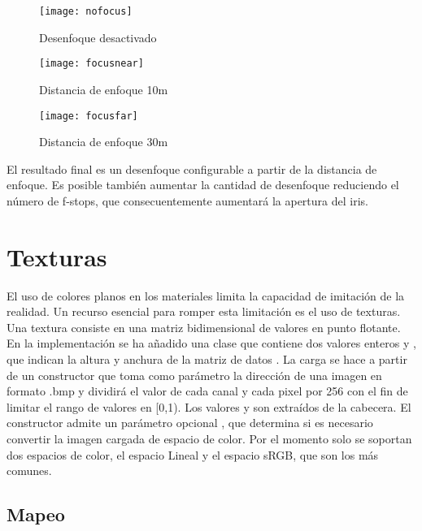\begin{figure}[H]
\label{fig:focusboxes}
	\centering
  \begin{minipage}[b]{0.3\textwidth}
	\texttt{[image: nofocus]}
	\caption{Desenfoque desactivado}
  \end{minipage}
  \hfill
  \begin{minipage}[b]{0.3\textwidth}
	\texttt{[image: focusnear]}
	\caption{Distancia de enfoque 10m}
  \end{minipage}
  	\hfill
  \begin{minipage}[b]{0.3\textwidth}
	\texttt{[image: focusfar]}
	\caption{Distancia de enfoque 30m}
  \end{minipage}
\end{figure}
	
	
El resultado final es un desenfoque configurable a partir de la distancia de enfoque. Es posible también aumentar la cantidad de desenfoque reduciendo el número de f-stops, que consecuentemente aumentará la apertura del iris.

	
\section{Texturas}
	
El uso de colores planos en los materiales limita la capacidad de imitación de la realidad. Un recurso esencial para romper esta limitación es el uso de texturas. Una textura consiste en una matriz bidimensional de valores en punto flotante. En la implementación se ha añadido una clase  que contiene dos valores enteros  y , que indican la altura y anchura de la matriz de datos . La carga se hace a partir de un constructor que toma como parámetro la dirección de una imagen en formato .bmp y dividirá el valor de cada canal y cada pixel por 256 con el fin de limitar el rango de valores en [0,1). Los valores  y  son extraídos de la cabecera. El constructor admite un parámetro opcional , que determina si es necesario convertir la imagen cargada de espacio de color. Por el momento solo se soportan dos espacios de color, el espacio Lineal y el espacio sRGB, que son los más comunes.
	
	
\subsection{Mapeo}

